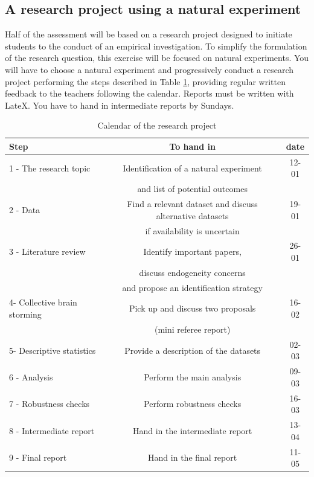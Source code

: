 \documentclass[a4paper,french,11pt]{article}
\begin{document}
\subsection*{A research project using a natural experiment}
Half of the assessment will be based on a research project designed to initiate students to the conduct of an empirical investigation. To simplify the formulation of the research question, this exercise will be focused on natural experiments. You will have to choose a natural experiment and progressively conduct a research project performing the steps described in Table \ref{tab:my_label}, providing regular written feedback to the teachers following the calendar. Reports must be written with LateX. You have to hand in intermediate reports by Sundays. 
 
\begin{table}[h!]
  \centering
  \begin{tabular}{lcc}
     \hline \hline 
   Step  & To hand in & date \\
 \hline 
   1 - The research topic & Identification of a natural experiment & 12-01 \\ 
			& and list of potential outcomes \\ 
      2 - Data & Find a relevant dataset and discuss alternative datasets & 19-01 \\ 
      & if availability is uncertain \\ 
    3 - Literature review & Identify important papers, & 26-01 \\
    & discuss endogeneity concerns &\\
    & and propose an identification strategy \\
        4- Collective brain storming & Pick up and discuss two proposals & 16-02 \\
        & (mini referee report)  \\
        5- Descriptive statistics & Provide a description of the datasets & 02-03 \\
        6 - Analysis &Perform the main analysis & 09-03 \\
        7 - Robustness checks & Perform robustness checks & 16-03 \\
        8 - Intermediate report & Hand in the intermediate report & 13-04 \\ 
        9 - Final report & Hand in the final report& 11-05 \\

       \hline \hline 
  \end{tabular}
  \caption{Calendar of the research project}
  \label{tab:my_label}
\end{table}
\end{document}
